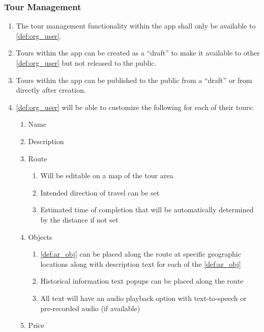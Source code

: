 \documentclass{article}
\begin{document}
\subsubsection{Tour Management}
\label{ssub:tour_management}

\begin{enumerate}[align=left, label=\textbf{TM-FR\arabic*:}]
    \item The tour management functionality within the app shall only be available to \ref{def:org_user}.
    \item Tours within the app can be created as a “draft” to make it available to other \ref{def:org_user} but not released to the public.
    \item Tours within the app can be published to the public from a “draft” or from directly after creation.
    \item \ref{def:org_user} will be able to customize the following for each of their tours:
          \begin{enumerate}
              \item Name
              \item Description
              \item Route
                    \begin{enumerate}
                        \item Will be editable on a map of the tour area
                        \item Intended direction of travel can be set
                        \item Estimated time of completion that will be automatically determined by the distance if not set
                    \end{enumerate}
              \item Objects
                    \begin{enumerate}
                        \item \ref{def:ar_obj} can be placed along the route at specific geographic locations along with description text for each of the \ref{def:ar_obj}
                        \item Historical information text popups can be placed along the route
                        \item All text will have an audio playback option with text-to-speech or pre-recorded audio (if available)
                    \end{enumerate}
              \item Price
                    \begin{enumerate}

\end{enumerate}
\end{enumerate}
\end{enumerate}
\end{document}
